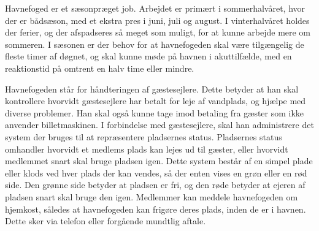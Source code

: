 Havnefoged er et sæsonpræget job. Arbejdet er primært i sommerhalvåret, hvor der er bådsæson, med et ekstra pres i juni, juli og august. I vinterhalvåret holdes der ferier, og der afspadseres så meget som muligt, for at kunne arbejde mere om sommeren. I sæsonen er der behov for at havnefogeden skal være tilgængelig de fleste timer af døgnet, og skal kunne møde på havnen i akuttilfælde, med en reaktionstid på omtrent en halv time eller mindre.

Havnefogeden står for håndteringen af gæstesejlere. Dette betyder at han skal kontrollere hvorvidt gæstesejlere har betalt for leje af vandplads, og hjælpe med diverse problemer. Han skal også kunne tage imod betaling fra gæster som ikke anvender billetmaskinen. I forbindelse med gæstesejlere, skal han administrere det system der bruges til at repræsentere pladsernes status. Pladsernes status omhandler hvorvidt et medlems plads kan lejes ud til gæster, eller hvorvidt medlemmet snart skal bruge pladsen igen. Dette system består af en simpel plade eller klods ved hver plads der kan vendes, så der enten vises en grøn eller en rød side. Den grønne side betyder at pladsen er fri, og den røde betyder at ejeren af pladsen snart skal bruge den igen. Medlemmer kan meddele havnefogeden om hjemkost, således at havnefogeden kan frigøre deres plads, inden de er i havnen. Dette sker via telefon eller forgående mundtlig aftale.


